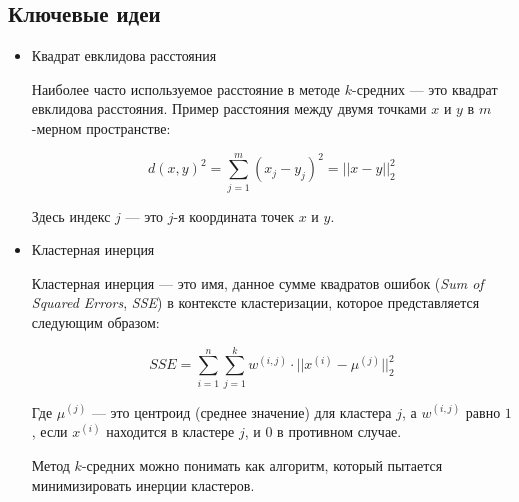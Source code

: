 \subsection{Ключевые идеи}

\begin{itemize}

\item Квадрат евклидова расстояния

Наиболее часто используемое расстояние в методе $k$-средних --- это квадрат евклидова расстояния. Пример расстояния между двумя точками $x$ и $y$ в $m$-мерном пространстве:

$$d(x, y)^2 = \sum\limits_{j=1}^m (x_j - y_j)^2 = ||x - y||^2_2$$

Здесь индекс $j$ --- это $j$-я координата точек $x$ и $y$.
\item Кластерная инерция

Кластерная инерция --- это имя, данное сумме квадратов ошибок (\textit{Sum of Squared Errors}, \textit{SSE}) в контексте кластеризации, которое представляется следующим образом:

$$SSE = \sum\limits_{i=1}^n\sum\limits_{j=1}^k w^{(i, j)} \cdot ||x^{(i)} - \mu^{(j)}||_2^2$$

Где $\mu^{(j)}$ --- это центроид (среднее значение) для кластера $j$, а $w^{(i, j)}$ равно $1$, если $x^{(i)}$ находится в кластере $j$, и $0$ в противном случае.

Метод $k$-средних можно понимать как алгоритм, который пытается минимизировать инерции кластеров.

\end{itemize}
